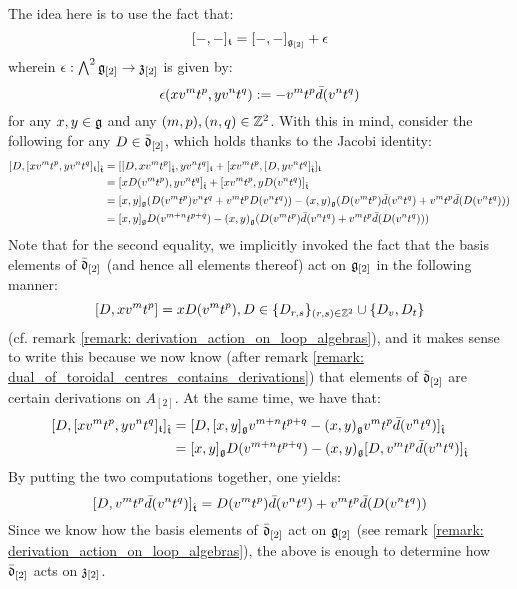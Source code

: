 \begin{remark}
                The idea here is to use the fact that:
                    $$[-, -]_{\mathfrak{t}} = [-, -]_{\mathfrak{g}_{[2]}} + \epsilon$$
                wherein $\epsilon: \bigwedge^2 \mathfrak{g}_{[2]} \to \mathfrak{z}_{[2]}$ is given by:
                    $$\epsilon(x v^m t^p, y v^n t^q) := -v^m t^p \bar{d}(v^n t^q)$$
                for any $x, y \in \mathfrak{g}$ and any $(m, p), (n, q) \in \mathbb{Z}^2$. With this in mind, consider the following for any $D \in \bar{\mathfrak{d}}_{[2]}$, which holds thanks to the Jacobi identity:
                    $$
                        \begin{aligned}
                            [ D, [x v^m t^p, y v^n t^q]_{\t} ]_{\hat{\t}} & = [ [D, x v^m t^p]_{\hat{\t}}, y v^n t^q ]_{\t} + [ x v^m t^p, [D, y v^n t^q]_{\hat{\t}} ]_{\t}
                            \\
                            & = [x D(v^m t^p), y v^n t^q]_{\hat{\t}} + [x v^m t^p, y D(v^n t^q)]_{\hat{\t}}
                            \\
                            & = [x, y]_{\g} (D(v^m t^p) v^n t^q + v^m t^p D(v^n t^q)) - (x, y)_{\g} ( D(v^m t^p) \bar{d}(v^n t^q) + v^m t^p \bar{d}(D(v^n t^q)) )
                            \\
                            & = [x, y]_{\g} D(v^{m + n} t^{p + q}) - (x, y)_{\g} ( D(v^m t^p) \bar{d}(v^n t^q) + v^m t^p \bar{d}(D(v^n t^q)) )
                        \end{aligned}
                    $$
                Note that for the second equality, we implicitly invoked the fact that the basis elements of $\bar{\mathfrak{d}}_{[2]}$ (and hence all elements thereof) act on $\mathfrak{g}_{[2]}$ in the following manner:
                    $$[D, x v^m t^p] = x D(v^m t^p), D \in \{D_{r, s}\}_{(r, s) \in \mathbb{Z}^2} \cup \{D_v, D_t\}$$
                (cf. remark \ref{remark: derivation_action_on_loop_algebras}), and it makes sense to write this because we now know (after remark \ref{remark: dual_of_toroidal_centres_contains_derivations}) that elements of $\bar{\mathfrak{d}}_{[2]}$ are certain derivations on $A_{[2]}$. At the same time, we have that:
                    $$
                        \begin{aligned}
                            [ D, [x v^m t^p, y v^n t^q]_{\t} ]_{\hat{\t}} & = [ D, [x, y]_{\g} v^{m + n} t^{p + q} - (x, y)_{\g} v^m t^p \bar{d}(v^n t^q) ]_{\hat{\t}}
                            \\
                            & = [x, y]_{\g} D(v^{m + n} t^{p + q}) - (x, y)_{\g} [D, v^m t^p \bar{d}(v^n t^q)]_{\hat{\t}}
                        \end{aligned}
                    $$
                By putting the two computations together, one yields:
                    $$[D, v^m t^p \bar{d}(v^n t^q)]_{\hat{\mathfrak{t}}} = D(v^m t^p) \bar{d}(v^n t^q) + v^m t^p \bar{d}(D(v^n t^q))$$
                Since we know how the basis elements of $\bar{\mathfrak{d}}_{[2]}$ act on $\mathfrak{g}_{[2]}$ (see remark \ref{remark: derivation_action_on_loop_algebras}), the above is enough to determine how $\bar{\mathfrak{d}}_{[2]}$ acts on $\mathfrak{z}_{[2]}$. 


\end{remark}
